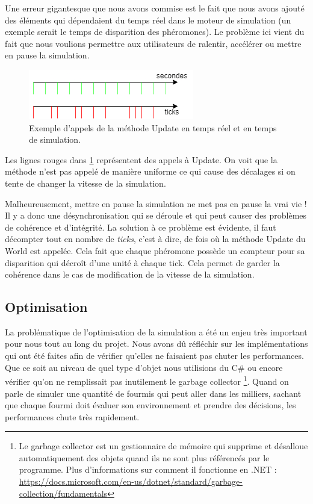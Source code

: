 \documentclass{EPUProjetDi}
\begin{document}
Une erreur gigantesque que nous avons commise est le fait que nous avons ajouté des éléments qui dépendaient du temps réel dans le moteur de simulation (un exemple serait le temps de disparition des phéromones).
Le problème ici vient du fait que nous voulions permettre aux utilisateurs de ralentir, accélérer ou mettre en pause la simulation.

\begin{figure}[h]
    \centering
    \includegraphics[scale=1]{ticks_secondes.png}
    \caption{Exemple d'appels de la méthode Update en temps réel et en temps de simulation.}
    \label{fig:ticks_secondes}
\end{figure}

Les lignes rouges dans \ref{fig:ticks_secondes} représentent des appels à Update. On voit que la méthode n'est pas appelé de manière uniforme ce qui cause des décalages si on tente de changer la vitesse de la simulation.

Malheureusement, mettre en pause la simulation ne met pas en pause la vrai vie ! Il y a donc une désynchronisation qui se déroule et qui peut causer des problèmes de cohérence et d'intégrité.
La solution à ce problème est évidente, il faut décompter tout en nombre de \textit{ticks}, c'est à dire, de fois où la méthode Update du World est appelée. 
Cela fait que chaque phéromone possède un compteur pour sa disparition qui décroît d'une unité à chaque tick. Cela permet de garder la cohérence dans le cas de modification de la vitesse de la simulation.

\subsection{Optimisation}

La problématique de l'optimisation de la simulation a été un enjeu très important pour nous tout au long du projet. Nous avons dû réfléchir sur les implémentations qui ont été faites afin de vérifier qu'elles ne 
faisaient pas chuter les performances. Que ce soit au niveau de quel type d'objet nous utilisions du C\# ou encore vérifier qu'on ne remplissait pas inutilement le garbage collector 
\footnote{Le garbage collector est un gestionnaire de mémoire qui supprime et désalloue automatiquement des objets quand ils ne sont plus référencés par le programme. 
Plus d'informations sur comment il fonctionne en .NET : \url{https://docs.microsoft.com/en-us/dotnet/standard/garbage-collection/fundamentals}}.
Quand on parle de simuler une quantité de fourmis qui peut aller dans les milliers, sachant que chaque fourmi doit évaluer son environnement et prendre des décisions, les performances chute très rapidement.
\end{document}
